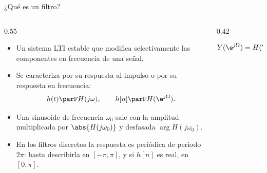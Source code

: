 \documentclass[aspectratio=169,11pt]{beamer}
\begin{document}
\begin{frame}{¿Qué es un filtro?}
  \begin{columns}[c]
    \begin{column}{0.55\textwidth}
      \begin{itemize}\small
        \item Un sistema LTI estable que modifica \alert{selectivamente} las componentes en frecuencia de una señal.
        \item Se caracteriza por su respuesta al impulso o por su respuesta en frecuencia:
        \[
          h(t)\parF H(j\omega),\qquad h[n]\parF H(\e^{j\Omega}).
        \]
        \item Una sinusoide de frecuencia $\omega_0$ sale con la amplitud multiplicada por $\abs{H(j\omega_0)}$ y desfasada $\arg H(j\omega_0)$.
        \item En los filtros discretos la respuesta es periódica de periodo $2\pi$: basta describirla en $[-\pi,\pi]$, y si $h[n]$ es real, en $[0,\pi]$.
      \end{itemize}
    \end{column}
    \begin{column}{0.42\textwidth}
      \begin{center}
      \end{center}
      \[
        Y(\e^{j\Omega})=H(\e^{j\Omega})\,X(\e^{j\Omega})
      \]
    \end{column}
  \end{columns}
\end{frame}
\end{document}
